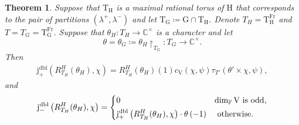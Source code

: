 \documentclass[12pt, reqno]{amsart}
\newtheorem{theorem}{Theorem}[section]
\theoremstyle{definition}
\theoremstyle{definition}
\theoremstyle{definition}
\newcommand{\cComplex}{\mathbb{C}}
\newcommand{\multiplicativegroup}[1]{#1^{\times}}
\newcommand{\hermitianSpace}{\mathrm{V}}
\newcommand{\fieldCharacter}{\psi}
\newcommand{\finiteField}{\mathbb{F}}
\newcommand{\Frobenius}{\operatorname{Fr}}
\newcommand{\dblPosVirtualJacobiSumScalar}[2]{\mathrm{j}_{+}^{\mathrm{dbl}}\left(#1, #2\right)}
\newcommand{\dblNegVirtualJacobiSumScalar}[2]{\mathrm{j}_{-}^{\mathrm{dbl}}\left(#1, #2\right)}
\newcommand{\GaussSumTorusCharacter}[4]{\tau_{#1}\left(#2 \times #3, #4\right)}
\newcommand{\algebraicGroup}[1]{\boldsymbol{\mathrm{#1}}}
\newcommand{\RTGTheta}[3]{R_{#1}^{#2}(#3)}
\begin{document}
\begin{theorem}\label{thm:computation-of-doubling-gauss-sum-scalar-for-deligne-lusztig-characters}
	Suppose that $\algebraicGroup{T}_{\algebraicGroup{H}}$ is a maximal rational torus of $\algebraicGroup{H}$ that corresponds to the pair of partitions $\left(\lambda^+, \lambda^-\right)$ and let $\algebraicGroup{T}_{\algebraicGroup{G}} \coloneq \algebraicGroup{G} \cap \algebraicGroup{T}_{\algebraicGroup{H}}$. Denote $T_H = \algebraicGroup{T}_{\algebraicGroup{H}}^{\Frobenius}$ and $T = T_G = \algebraicGroup{T}_{\algebraicGroup{G}}^{\Frobenius}$. Suppose that $\theta_{H} \colon T_H \to \multiplicativegroup{\cComplex}$ is a character and let $$\theta = \theta_{G} \coloneq \theta_{H} \restriction_{T_G} \colon T_G \to \multiplicativegroup{\cComplex}.$$ Then
	\begin{align*}
		 \dblPosVirtualJacobiSumScalar{\RTGTheta{T_H}{H}{\theta_H}}{\chi} = \RTGTheta{T_H}{H}{\theta_H}\left(1\right) c_{\hermitianSpace}\left(\chi, \fieldCharacter\right) \GaussSumTorusCharacter{T'}{\theta'}{\chi}{\fieldCharacter},
	\end{align*}
	and \begin{align*}
		\dblNegVirtualJacobiSumScalar{\RTGTheta{T_H}{H}{\theta_H}}{\chi} = \begin{dcases}
			0 & \dim_{\finiteField} \hermitianSpace \text{ is odd,}\\
			\dblPosVirtualJacobiSumScalar{\RTGTheta{T_H}{H}{\theta_H}}{\chi} \cdot \theta\left(-1\right) & \text{ otherwise.}
		\end{dcases}
	\end{align*}
\end{theorem}
\end{document}
